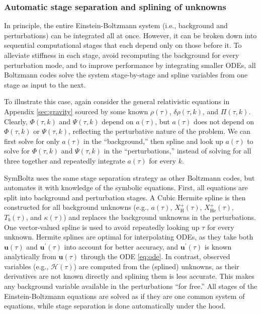 \documentclass{aa}
\newcommand\scrH{\mathscr{H}}
\newcommand\Hy{\mathrm{H}}
\newcommand\He{\mathrm{He}}
\begin{document}
\subsubsection{Automatic stage separation and splining of unknowns}
\label{sec:splining}

In principle, the entire Einstein-Boltzmann system (i.e., background and perturbations) can be integrated all at once.
However, it can be broken down into sequential computational stages that each depend only on those before it.
To alleviate stiffness in each stage, avoid recomputing the background for every perturbation mode, and to improve performance by integrating smaller ODEs, all Boltzmann codes solve the system stage-by-stage and spline variables from one stage as input to the next.

To illustrate this case, again consider the general relativistic equations in Appendix \ref{sec:gravity} sourced by some known $\rho(\tau)$, $\delta\rho(\tau,k)$, and $\Pi(\tau,k)$.
Clearly, $\Phi(\tau,k)$ and $\Psi(\tau,k)$ depend on $a(\tau)$, but $a(\tau)$ does not depend on $\Phi(\tau,k)$ or $\Psi(\tau,k)$, reflecting the perturbative nature of the problem.
We can first solve for only $a(\tau)$ in the \enquote{background,} then spline and look up $a(\tau)$ to solve for $\Phi(\tau,k)$ and $\Psi(\tau,k)$ in the \enquote{perturbations,} instead of solving for all three together and repeatedly integrate $a(\tau)$ for every $k$.

SymBoltz uses the same stage separation strategy as other Boltzmann codes,
but automates it with knowledge of the symbolic equations.
First, all equations are split into background and perturbation stages.
A Cubic Hermite spline is then constructed for all background unknowns (e.g., $a(\tau)$, $X_\Hy^+(\tau)$, $X_\He^+(\tau)$, $T_b(\tau)$, and $\kappa(\tau)$) and replaces the background unknowns in the perturbations.
One vector-valued spline is used to avoid repeatedly looking up $\tau$ for every unknown.
Hermite splines are optimal for interpolating ODEs, as they take both $\boldsymbol{u}(\tau)$ and $\boldsymbol{u}^\prime(\tau)$ into account for better accuracy, and $\boldsymbol{u}^\prime(\tau)$ is known analytically from $\boldsymbol{u}(\tau)$ through the ODE \eqref{eq:ode}.
In contrast, observed variables (e.g., $\scrH(\tau)$) are computed from the (splined) unknowns, as their derivatives are not known directly and splining them is less accurate.
This makes any background variable available in the perturbations \enquote{for free.}
All stages of the Einstein-Boltzmann equations are solved as if they are one common system of equations,
while stage separation is done automatically under the hood.
\end{document}
